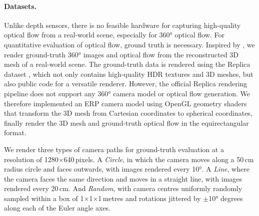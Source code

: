 \paragraph{Datasets.}
%
%
%
Unlike depth sensors, %
there is no feasible hardware for capturing high-quality optical flow from a real-world scene, especially for 360° optical flow.
%
For quantitative evaluation of optical flow, ground truth is necessary.
%
Inspired by \citet{ShugrLKLSSF2019}, we render ground-truth 360° images and optical flow from the reconstructed 3D mesh of a real-world scene.
The ground-truth data is rendered using the Replica dataset \cite{StrauWMCWGEMRVCYBYPYZLCBGMPSBSNGLN2019}, which not only contains high-quality HDR textures and 3D meshes, but also public code for a versatile renderer.
%
However, the official Replica rendering pipeline does not support any 360° camera model or optical flow generation.
We therefore implemented an ERP camera model using OpenGL geometry shaders that transform the 3D mesh from Cartesian coordinates to spherical coordinates, finally render the 3D mesh and ground-truth optical flow in the equirectangular format.


We render three types of camera paths for ground-truth evaluation at a resolution of 1280$\times$640\,pixels.
A \emph{Circle}, in which the camera moves along a 50\,cm radius circle and faces outwards, with images rendered every 10°.
A \emph{Line}, where the camera faces the same direction and moves in a straight line, with images rendered every 20\,cm.
And \emph{Random}, with camera centres uniformly randomly sampled within a box of 1$\times$1$\times$1\,metres and rotations jittered by $\pm$10° degrees along each of the Euler angle axes.


